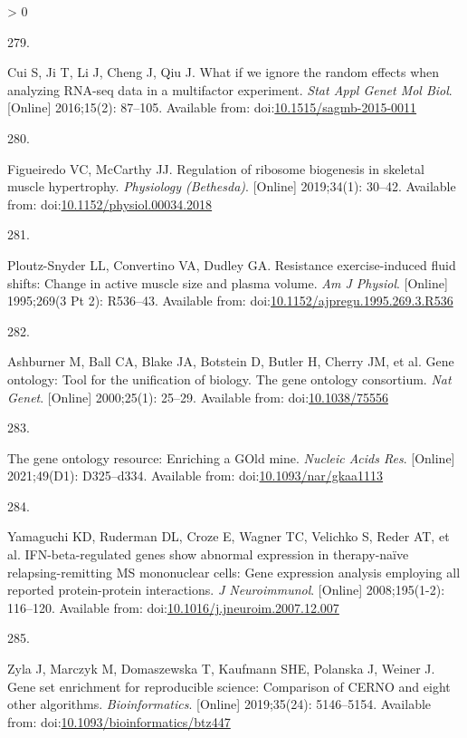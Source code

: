 \documentclass[twoside,10pt]{gihclass} %
\newlength{\cslhangindent}
\newlength{\csllabelwidth}
\newenvironment{CSLReferences}[3] %
 {%
  \setlength{\parindent}{0pt}
  \ifodd #1 \everypar{\setlength{\hangindent}{\cslhangindent}}\ignorespaces\fi
  \ifnum #2 > 0
  \setlength{\parskip}{#2\baselineskip}
  \fi
 }%
 {}
\newcommand{\CSLLeftMargin}[1]{\parbox[t]{\maxof{\widthof{#1}}{\csllabelwidth}}{#1}}
\newcommand{\CSLRightInline}[1]{\parbox[t]{\linewidth}{#1}}
\begin{document}
\begin{CSLReferences}{0}{0}
\leavevmode\hypertarget{ref-RN2366}{}%
\CSLLeftMargin{279. }
\CSLRightInline{Cui S, Ji T, Li J, Cheng J, Qiu J. What if we ignore the random effects when analyzing RNA-seq data in a multifactor experiment. \emph{Stat Appl Genet Mol Biol}. {[}Online{]} 2016;15(2): 87--105. Available from: doi:\href{https://doi.org/10.1515/sagmb-2015-0011}{10.1515/sagmb-2015-0011}}

\leavevmode\hypertarget{ref-RN2142}{}%
\CSLLeftMargin{280. }
\CSLRightInline{Figueiredo VC, McCarthy JJ. Regulation of ribosome biogenesis in skeletal muscle hypertrophy. \emph{Physiology (Bethesda)}. {[}Online{]} 2019;34(1): 30--42. Available from: doi:\href{https://doi.org/10.1152/physiol.00034.2018}{10.1152/physiol.00034.2018}}

\leavevmode\hypertarget{ref-RN2270}{}%
\CSLLeftMargin{281. }
\CSLRightInline{Ploutz-Snyder LL, Convertino VA, Dudley GA. Resistance exercise-induced fluid shifts: Change in active muscle size and plasma volume. \emph{Am J Physiol}. {[}Online{]} 1995;269(3 Pt 2): R536--43. Available from: doi:\href{https://doi.org/10.1152/ajpregu.1995.269.3.R536}{10.1152/ajpregu.1995.269.3.R536}}

\leavevmode\hypertarget{ref-RN2889}{}%
\CSLLeftMargin{282. }
\CSLRightInline{Ashburner M, Ball CA, Blake JA, Botstein D, Butler H, Cherry JM, et al. Gene ontology: Tool for the unification of biology. The gene ontology consortium. \emph{Nat Genet}. {[}Online{]} 2000;25(1): 25--29. Available from: doi:\href{https://doi.org/10.1038/75556}{10.1038/75556}}

\leavevmode\hypertarget{ref-RN2890}{}%
\CSLLeftMargin{283. }
\CSLRightInline{The gene ontology resource: Enriching a GOld mine. \emph{Nucleic Acids Res}. {[}Online{]} 2021;49(D1): D325--d334. Available from: doi:\href{https://doi.org/10.1093/nar/gkaa1113}{10.1093/nar/gkaa1113}}

\leavevmode\hypertarget{ref-RN2439}{}%
\CSLLeftMargin{284. }
\CSLRightInline{Yamaguchi KD, Ruderman DL, Croze E, Wagner TC, Velichko S, Reder AT, et al. IFN-beta-regulated genes show abnormal expression in therapy-naïve relapsing-remitting MS mononuclear cells: Gene expression analysis employing all reported protein-protein interactions. \emph{J Neuroimmunol}. {[}Online{]} 2008;195(1-2): 116--120. Available from: doi:\href{https://doi.org/10.1016/j.jneuroim.2007.12.007}{10.1016/j.jneuroim.2007.12.007}}

\leavevmode\hypertarget{ref-RN2438}{}%
\CSLLeftMargin{285. }
\CSLRightInline{Zyla J, Marczyk M, Domaszewska T, Kaufmann SHE, Polanska J, Weiner J. Gene set enrichment for reproducible science: Comparison of CERNO and eight other algorithms. \emph{Bioinformatics}. {[}Online{]} 2019;35(24): 5146--5154. Available from: doi:\href{https://doi.org/10.1093/bioinformatics/btz447}{10.1093/bioinformatics/btz447}}


\end{CSLReferences}
\end{document}
